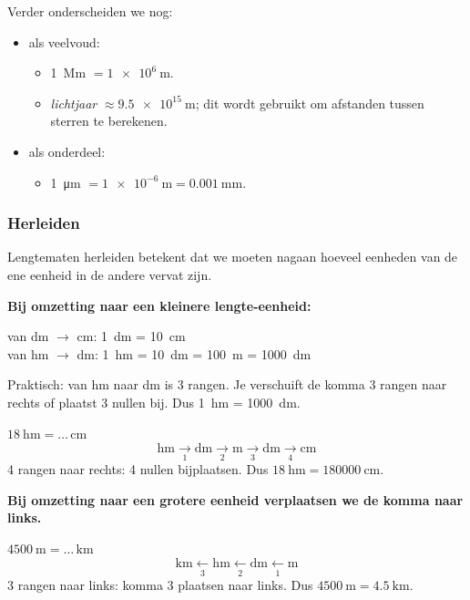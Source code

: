 \documentclass{bis}
\begin{document}
Verder onderscheiden we nog:
\begin{itemize}
\item als veelvoud:
  \begin{itemize}
  \item \SI{1}{\mega\metre} $= \SI{1e6}{\metre}$.
  \item \emph{lichtjaar} $\approx \SI{9.5e15}{\metre}$; dit wordt gebruikt om afstanden tussen sterren te berekenen.
  \end{itemize}
\item als onderdeel:
  \begin{itemize}
  \item \SI{1}{\micro\metre} $= \SI{1e-6}{\metre} = \SI{0.001}{\milli\metre}$.
  \end{itemize}
\end{itemize}

\subsubsection{Herleiden}
Lengtematen herleiden betekent dat we moeten nagaan hoeveel eenheden van de ene eenheid in de andere vervat zijn.

\textbf{Bij omzetting naar een kleinere lengte-eenheid:}

\begin{voorbeeld}
van \si{\deci\metre} $\to$ \si{\centi\metre}: \quad \SI{1}{\deci\metre} = \SI{10}{\centi\metre}\\[0.4em]
van \si{\hecto\metre} $\to$ \si{\deci\metre}: \quad \SI{1}{\hecto\metre} = \SI{10}{\deca\metre} = \SI{100}{\metre} = \SI{1000}{\deci\metre}

Praktisch: van \si{\hecto\metre} naar \si{\deci\metre} is 3 rangen. Je verschuift de komma 3 rangen naar rechts of plaatst 3 nullen bij. Dus \SI{1}{\hecto\metre} = \SI{1000}{\deci\metre}.
\end{voorbeeld}

\begin{voorbeeld}
\(\SI{18}{\hecto\metre}=\ldots\,\si{\centi\metre}\)
\[
  \si{\hecto\metre}\xrightarrow[1]{}\si{\deca\metre}\xrightarrow[2]{}\si{\metre}\xrightarrow[3]{}\si{\deci\metre}\xrightarrow[4]{}\si{\centi\metre}
\]
4 rangen naar rechts: 4 nullen bijplaatsen. Dus \(\SI{18}{\hecto\metre}=\SI{180000}{\centi\metre}\).
\end{voorbeeld}

\textbf{Bij omzetting naar een grotere eenheid verplaatsen we de komma naar links.}

\begin{voorbeeld}
\(\SI{4500}{\metre}=\ldots\,\si{\kilo\metre}\)
\[
\si{\kilo\metre}\xleftarrow[3]{}\si{\hecto\metre}\xleftarrow[2]{}\si{\deca\metre}\xleftarrow[1]{}\si{\metre}
\]
3 rangen naar links: komma 3 plaatsen naar links. Dus \(\SI{4500}{\metre}=\SI{4.5}{\kilo\metre}\).
\end{voorbeeld}
\end{document}
